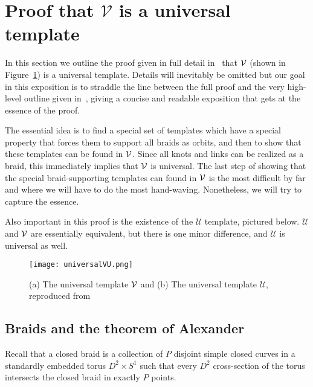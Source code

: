 \documentclass[paper.tex]{subfiles}
\begin{document}
\section{Proof that $\mathcal{V}$ is a universal template}

In this section we outline the proof given in full detail in~\cite{Ghrist1996} that $\mathcal{V}$ (shown in Figure~\ref{fig:universal}) is a universal template. Details will inevitably be omitted but our goal in this exposition is to straddle the line between
the full proof and the very high-level outline given in~\cite{knottyode}, giving a concise and readable exposition that gets at the essence of the proof.

The essential idea is to find a special set of templates which have a special property that forces them to support all braids as orbits, and then to show that these templates can be found in $\mathcal{V}$. Since all knots and links
can be realized as a braid, this immediately implies that $\mathcal{V}$ is universal. The last step of showing that the special braid-supporting templates can found in $\mathcal{V}$ is the most difficult by far and where we will have to do the
most hand-waving. Nonetheless, we will try to capture the essence.

Also important in this proof is the existence of the $\mathcal{U}$ template, pictured below. $\mathcal{U}$ and $\mathcal{V}$ are essentially equivalent, but there is one minor difference, and $\mathcal{U}$ is universal as well.

\begin{figure}[h]

  \centering
  \texttt{[image: universalVU.png]}
  \caption{(a) The universal template $\mathcal{V}$ and (b) The universal template $\mathcal{U}$, reproduced from~\cite{ghs1997}}\label{fig:universal}
\end{figure}


\subsection{Braids and the theorem of Alexander}

Recall that a closed braid is a collection of $P$ disjoint simple closed curves in a standardly embedded torus $D^2 \times S^1$ such that every $D^2$ cross-section of the torus intersects the closed braid in exactly $P$ points.
\end{document}
